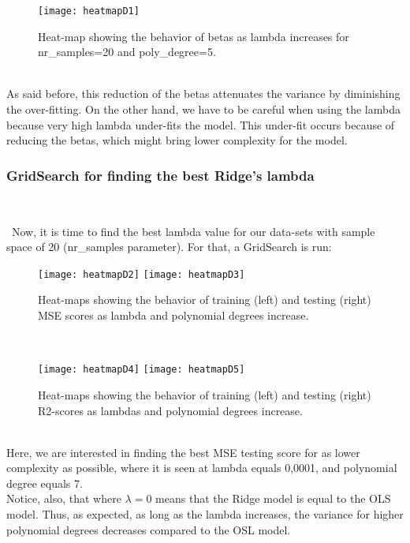 \begin{figure}[H]
\label{fig:heatmapD1}
\centering
\texttt{[image: heatmapD1]}
\caption{Heat-map showing the behavior of betas as lambda increases for nr\_samples=20 and poly\_degree=5.}
\end{figure} \\

As said before, this reduction of the betas attenuates the variance by diminishing the over-fitting. On the other hand, we have to be careful when using the lambda because very high lambda under-fits the model. This under-fit occurs because of reducing the betas, which might bring lower complexity for the model.\\

\subsubsection{GridSearch for finding the best Ridge's lambda} \\
\label{chap:GridSearch for finding the best Ridge's lambda}

\quad \, Now, it is time to find the best lambda value for our data-sets with sample space of 20 (nr\_samples parameter). For that, a GridSearch is run:\\

\begin{figure}[H]
\label{fig:heatmapD2andD3}
\centering
\texttt{[image: heatmapD2]}
\texttt{[image: heatmapD3]}
\caption{Heat-maps showing the behavior of training (left) and testing (right) MSE scores as lambda and polynomial degrees increase.}
\end{figure}\\

\begin{figure}[H]
\label{fig:heatmapD4andD5}
\centering
\texttt{[image: heatmapD4]}
\texttt{[image: heatmapD5]}
\caption{Heat-maps showing the behavior of training (left) and testing (right) R2-scores as lambdas and polynomial degrees increase.}
\end{figure}\\

Here, we are interested in finding the best MSE testing score for as lower complexity as possible, where it is seen at lambda equals 0,0001, and polynomial degree equals 7.\\

Notice, also, that where $\lambda=0$ means that the Ridge model is equal to the OLS model. Thus, as expected, as long as the lambda increases, the variance for higher polynomial degrees decreases compared to the OSL model. \\

